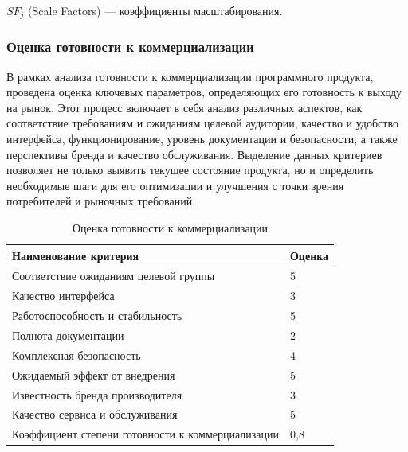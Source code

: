 $SF_j$ (Scale Factors) --- коэффициенты масштабирования.

\subsubsection{Оценка готовности к коммерциализации}

В рамках анализа готовности к коммерциализации программного продукта, проведена оценка ключевых параметров, определяющих его готовность к выходу на рынок. Этот процесс включает в себя анализ различных аспектов, как соответствие требованиям и ожиданиям целевой аудитории, качество и удобство интерфейса, функционирование, уровень документации и безопасности, а также перспективы бренда и качество обслуживания. Выделение данных критериев позволяет не только выявить текущее состояние продукта, но и определить необходимые шаги для его оптимизации и улучшения с точки зрения потребителей и рыночных требований.

\begin{table}[H]
    \caption{Оценка готовности к коммерциализации}
    \centering

    \emergencystretch=10pt
    \begin{tabular}{@{}ll@{}}
        \toprule
        \textbf{Наименование критерия}                    & \textbf{Оценка} \\ \midrule
        Соответствие ожиданиям целевой группы & 5 \\
        Качество интерфейса & 3 \\
        Работоспособность и стабильность & 5 \\
        Полнота документации & 2 \\
        Комплексная безопасность & 4 \\
        Ожидаемый эффект от внедрения & 5 \\
        Известность бренда производителя & 3 \\
        Качество сервиса и обслуживания & 5 \\ \midrule
        Коэффициент степени готовности к коммерциализации & 0,8 \\ \bottomrule
    \end{tabular}
    \label{tab:prepare_mark}
\end{table}


